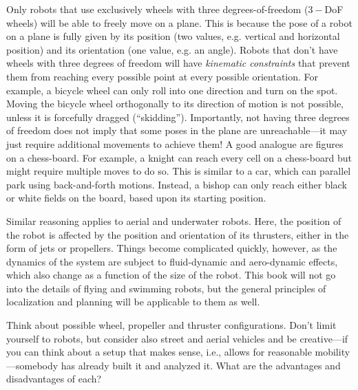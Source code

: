 Only robots that use exclusively wheels with three degrees-of-freedom ($3-$DoF wheels) will be able to freely move on a plane. This is because the pose of a robot on a plane is fully given by its position (two values, e.g. vertical and horizontal position) and its orientation (one value, e.g. an angle). Robots that don't have wheels with three degrees of freedom will have \textsl{kinematic constraints} that prevent them from reaching every possible point at every possible orientation. For example, a bicycle wheel can only roll into one direction and turn on the spot. Moving the bicycle wheel orthogonally to its direction of motion is not possible, unless it is forcefully dragged (``skidding''). Importantly, not having three degrees of freedom does not imply that some poses in the plane are unreachable---it may just require additional movements to achieve them!
A good analogue are figures on a chess-board. For example, a knight can reach every cell on a chess-board but might require multiple moves to do so. This is similar to a car, which can parallel park using back-and-forth motions. Instead, a bishop can only reach either black or white fields on the board, based upon its starting position.

Similar reasoning applies to aerial and underwater robots. Here, the position of the robot is affected by the position and orientation of its thrusters, either in the form of jets or propellers. Things become complicated quickly, however, as the dynamics of the system are subject to fluid-dynamic and aero-dynamic effects, which also change as a function of the size of the robot. This book will not go into the details of flying and swimming robots, but the general principles of localization and planning will be applicable to them as well.

\begin{mdframed} Think about possible wheel, propeller and thruster configurations. Don't limit yourself to robots, but consider also street and aerial vehicles and be creative---if you can think about a setup that makes sense, i.e., allows for reasonable mobility---somebody has already built it and analyzed it. What are the advantages and disadvantages of each?
\end{mdframed}

